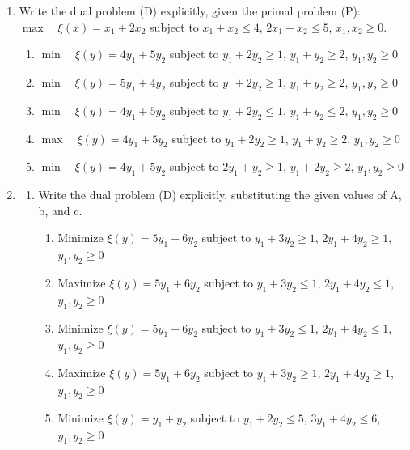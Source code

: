 \documentclass{article}%
\begin{document}
\begin{enumerate}
\begin{enumerate}%
\item $\xi(y) = y_1 + y_2$%
\item $\xi(y) = 5y_1 + 6y_2$%
\item $\xi(y) = y_1 + 2y_2$%
\item $\xi(y) = 6y_1 + 5y_2$%
\item $\xi(y) = 3y_1 + 4y_2$%
\end{enumerate}%
\vspace{1em}%
\item Write the dual problem (D) explicitly, given the primal problem (P): $\max \quad \xi(x) = x_1 + 2x_2$ subject to $x_1 + x_2 \le 4$, $2x_1 + x_2 \le 5$, $x_1, x_2 \ge 0$.%
\begin{enumerate}%
\item $\min \quad \xi(y) = 4y_1 + 5y_2$ subject to $y_1 + 2y_2 \ge 1$, $y_1 + y_2 \ge 2$, $y_1, y_2 \ge 0$%
\item $\min \quad \xi(y) = 5y_1 + 4y_2$ subject to $y_1 + 2y_2 \ge 1$, $y_1 + y_2 \ge 2$, $y_1, y_2 \ge 0$%
\item $\min \quad \xi(y) = 4y_1 + 5y_2$ subject to $y_1 + 2y_2 \le 1$, $y_1 + y_2 \le 2$, $y_1, y_2 \ge 0$%
\item $\max \quad \xi(y) = 4y_1 + 5y_2$ subject to $y_1 + 2y_2 \ge 1$, $y_1 + y_2 \ge 2$, $y_1, y_2 \ge 0$%
\item $\min \quad \xi(y) = 4y_1 + 5y_2$ subject to $2y_1 + y_2 \ge 1$, $y_1 + 2y_2 \ge 2$, $y_1, y_2 \ge 0$%
\end{enumerate}%
\vspace{1em}%
\item%
\begin{enumerate}%
\item Write the dual problem (D) explicitly, substituting the given values of A, b, and c.%
\begin{enumerate}%
\item Minimize $\xi(y) = 5y_1 + 6y_2$ subject to $y_1 + 3y_2 \ge 1$, $2y_1 + 4y_2 \ge 1$, $y_1, y_2 \ge 0$%
\item Maximize $\xi(y) = 5y_1 + 6y_2$ subject to $y_1 + 3y_2 \le 1$, $2y_1 + 4y_2 \le 1$, $y_1, y_2 \ge 0$%
\item Minimize $\xi(y) = 5y_1 + 6y_2$ subject to $y_1 + 3y_2 \le 1$, $2y_1 + 4y_2 \le 1$, $y_1, y_2 \ge 0$%
\item Maximize $\xi(y) = 5y_1 + 6y_2$ subject to $y_1 + 3y_2 \ge 1$, $2y_1 + 4y_2 \ge 1$, $y_1, y_2 \ge 0$%
\item Minimize $\xi(y) = y_1 + y_2$ subject to $y_1 + 2y_2 \le 5$, $3y_1 + 4y_2 \le 6$, $y_1, y_2 \ge 0$%

\end{enumerate}
\end{enumerate}
\end{enumerate}
\end{document}

